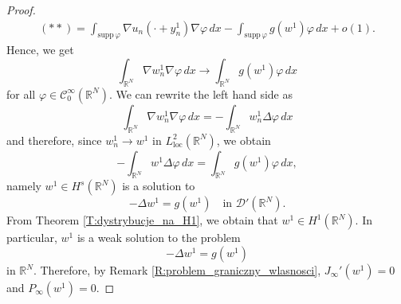 \documentclass[12pt,leqno,twoside,sort]{amsart}
\newcommand{\R}{\mathbb{R}}
\newcommand{\cC}{{\mathcal C}}
\newcommand{\cD}{{\mathcal D}}
\numberwithin{equation}{section}
\newcommand{\supp}{\mathrm{supp}\,}
\begin{document}
\begin{proof}
\begin{align*}
(**) = \int_{\supp \varphi} \nabla u_n(\cdot + y_n^1) \nabla \varphi \, dx - \int_{\supp \varphi} g( w^1) \varphi \, dx + o(1).
\end{align*}
Hence, we get
$$
\int_{\R^N} \nabla w_n^1 \nabla \varphi \, dx \to \int_{\R^N} g(w^1) \varphi \, dx
$$
for all $\varphi \in \cC_0^\infty (\R^N)$. We can rewrite the left hand side as
$$
\int_{\R^N} \nabla w_n^1 \nabla \varphi \, dx = - \int_{\R^N} w_n^1 \Delta \varphi \, dx
$$
and therefore, since $w_n^1 \to w^1$ in $L^2_{\mathrm{loc}}(\R^N)$, we obtain
$$
- \int_{\R^N} w^1 \Delta \varphi \, dx = \int_{\R^N} g(w^1) \varphi \, dx,
$$
namely $w^1 \in H^s (\R^N)$ is a solution to
$$
-\Delta w^1 = g(w^1) \quad \mbox{in } \cD' (\R^N).
$$
From Theorem \ref{T:dystrybucje_na_H1}, we obtain that $w^1 \in H^1 (\R^N)$. In particular, $w^1$ is a weak solution to the problem
\begin{equation}\label{eq:limiting}
-\Delta w^1 = g(w^1)
\end{equation}
in $\R^N$. Therefore, by Remark \ref{R:problem_graniczny_wlasnosci}, $J_\infty '(w^1) = 0$ and $P_\infty (w^1) = 0$.




\end{proof}
\end{document}
